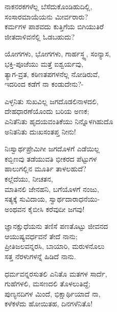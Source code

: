 \begin{myquote}
ನಾಕನರಕಗಳೆಲ್ಲ ಬೆಸೆದುಕೊಂಡಿಹುದಿಲ್ಲಿ,\\ಸಂಸಾರಮಾಯೆಯನು ಮೀರ್ವರಾರು?\\ಕರ್ಮಗಳ ಪಾಶವದು ಕುತ್ತಿಗೆಯ ಬಿಗಿಯುತಿರೆ\\ಜೀತದಾಳಿವನೆಲ್ಲಿ ಓಡಬಹುದು?
\end{myquote}

\begin{myquote}
ಯೋಗಗಳು, ಭೋಗಗಳು, ಗಾರ್ಹಸ್ಥ್ಯ, ಸಂನ್ಯಾಸ,\\ಭಕ್ತಿ-ಪೂಜೆಯು ಮತ್ತೆ ಐಶ್ವರ್ಯವು,\\ತ್ಯಾಗ-ವ್ರತ, ಕಠಿಣತಪಗಳನೆಲ್ಲ ನೋಡಿರುವೆ,\\ಇದರಿಂದ ಕಡೆಗೆ ನಾ ಕಂಡುದೇನು?-
\end{myquote}

\begin{myquote}
ಎಳ್ಳನಿತು ಸುಖವಿಲ್ಲ ಜಗದೊಡಲಿನಾಳದಲಿ,\\ದೇಹಧಾರಣೆಯೊಂದು ಬರಿಯ ಅಣಕ; \\ಎನಿತೆನಿತು ಹೃದಯವಂತಿಕೆಯು ನಿನ್ನೊಳಗಿಹುದೊ\\ಅನಿತನಿತು ದುಃಖಸಂತಪ್ತ ನೀನು!
\end{myquote}

\begin{myquote}
ನಿಃಸ್ವಾರ್ಥಪ್ರೇಮಿಗೀ ಜಗದೊಳಗೆ ಎಡೆಯಿಲ್ಲ\\ಕಬ್ಬಿಣವು ತಡೆಯುವತಿ ಭೀಕರದ ಪೆಟ್ಟುಗಳ\\ಹಾಲುಗಲ್ಲಿನ ಮೂರ್ತಿ ತಾಳಲಹುದೆ?\\ಕಲ್ಲೆದೆಯು, ನೀಚತನ,\\ಮಾತಿನಲಿ ಜೇನಹನಿ, ಬಗೆಯೊಳಗೆ ನಂಜು,\\ಸತ್ಯಕ್ಕೆ ಸುವಿದಾಯ, ಸ್ವಾರ್ಥದಾರಾಧನೆಯು-\\ಅಂಥವನ ಕೈಬೀಸಿ ಕರೆವುದೀ ಜಗವು!
\end{myquote}

\begin{myquote}
ಜ್ಞಾನಕ್ಷುಧೆಯನು ತಣಿಸೆ ಪಣತೊಟ್ಟು ಜೀವನದ \\ಆಯುಷ್ಯವರ್ಧವನೆ ತೇದೆ ನಾನು;\\ಪ್ರೀತಿಜಲವನ್ನರಸಿ, ಬಾಯಾರಿ, ಮರುಳನೊಲು\\ಸತ್ತ ನೆರಳುಗಳನ್ನೆ ಹಿಡಿದೆ ನಾನು.
\end{myquote}

\begin{myquote}
ಧರ್ಮವನ್ನರಸುತಲಿ ಎನಿತೊ ಮತಗಳ ಸಾರ್ದೆ,\\ಗುಹೆಗಳಲಿ, ಮಸಣದಲಿ ತೊಳಲುತಿದ್ದೆ;\\ಪುಣ್ಯನದಿಗಳ ಮಿಂದೆ, ಭಿಕ್ಷಾರ್ಥಿಯಾದೆ ನಾ,\\ಕಳೆಕಳೆದು ಹೋಯಿತಹ, ದಿನಗಳೆನಿತೊ!
\end{myquote}

